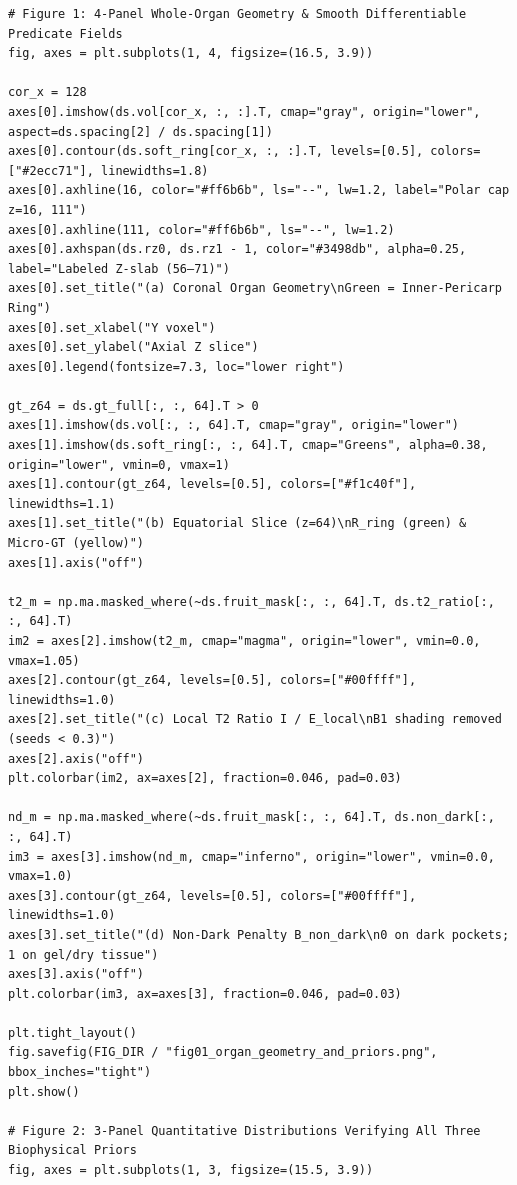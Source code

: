 \documentclass[10pt,a4paper]{article}
\renewcommand{\_}{\origunderscore\allowbreak}
\begin{document}
\begin{codebox}
\begin{lstlisting}[style=pybmed]
# Figure 1: 4-Panel Whole-Organ Geometry & Smooth Differentiable Predicate Fields
fig, axes = plt.subplots(1, 4, figsize=(16.5, 3.9))

cor_x = 128
axes[0].imshow(ds.vol[cor_x, :, :].T, cmap="gray", origin="lower", aspect=ds.spacing[2] / ds.spacing[1])
axes[0].contour(ds.soft_ring[cor_x, :, :].T, levels=[0.5], colors=["#2ecc71"], linewidths=1.8)
axes[0].axhline(16, color="#ff6b6b", ls="--", lw=1.2, label="Polar cap z=16, 111")
axes[0].axhline(111, color="#ff6b6b", ls="--", lw=1.2)
axes[0].axhspan(ds.rz0, ds.rz1 - 1, color="#3498db", alpha=0.25, label="Labeled Z-slab (56–71)")
axes[0].set_title("(a) Coronal Organ Geometry\nGreen = Inner-Pericarp Ring")
axes[0].set_xlabel("Y voxel")
axes[0].set_ylabel("Axial Z slice")
axes[0].legend(fontsize=7.3, loc="lower right")

gt_z64 = ds.gt_full[:, :, 64].T > 0
axes[1].imshow(ds.vol[:, :, 64].T, cmap="gray", origin="lower")
axes[1].imshow(ds.soft_ring[:, :, 64].T, cmap="Greens", alpha=0.38, origin="lower", vmin=0, vmax=1)
axes[1].contour(gt_z64, levels=[0.5], colors=["#f1c40f"], linewidths=1.1)
axes[1].set_title("(b) Equatorial Slice (z=64)\nR_ring (green) & Micro-GT (yellow)")
axes[1].axis("off")

t2_m = np.ma.masked_where(~ds.fruit_mask[:, :, 64].T, ds.t2_ratio[:, :, 64].T)
im2 = axes[2].imshow(t2_m, cmap="magma", origin="lower", vmin=0.0, vmax=1.05)
axes[2].contour(gt_z64, levels=[0.5], colors=["#00ffff"], linewidths=1.0)
axes[2].set_title("(c) Local T2 Ratio I / E_local\nB1 shading removed (seeds < 0.3)")
axes[2].axis("off")
plt.colorbar(im2, ax=axes[2], fraction=0.046, pad=0.03)

nd_m = np.ma.masked_where(~ds.fruit_mask[:, :, 64].T, ds.non_dark[:, :, 64].T)
im3 = axes[3].imshow(nd_m, cmap="inferno", origin="lower", vmin=0.0, vmax=1.0)
axes[3].contour(gt_z64, levels=[0.5], colors=["#00ffff"], linewidths=1.0)
axes[3].set_title("(d) Non-Dark Penalty B_non_dark\n0 on dark pockets; 1 on gel/dry tissue")
axes[3].axis("off")
plt.colorbar(im3, ax=axes[3], fraction=0.046, pad=0.03)

plt.tight_layout()
fig.savefig(FIG_DIR / "fig01_organ_geometry_and_priors.png", bbox_inches="tight")
plt.show()

# Figure 2: 3-Panel Quantitative Distributions Verifying All Three Biophysical Priors
fig, axes = plt.subplots(1, 3, figsize=(15.5, 3.9))


\end{lstlisting}
\end{codebox}
\end{document}
